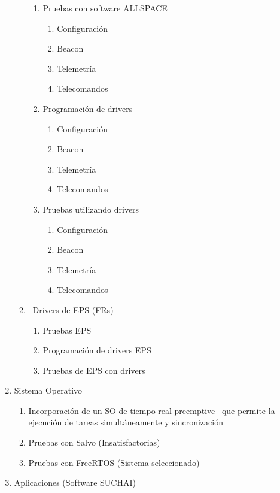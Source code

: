 \documentclass{article}
\begin{document}
\begin{enumerate}
\begin{enumerate}
\begin{enumerate}
\item Pruebas con software ALLSPACE

\begin{enumerate}
\item Configuración
\item Beacon
\item Telemetría
\item Telecomandos
\end{enumerate}
\item Programación de drivers

\begin{enumerate}
\item Configuración
\item Beacon
\item Telemetría
\item Telecomandos
\end{enumerate}
\item Pruebas utilizando drivers

\begin{enumerate}
\item Configuración
\item Beacon
\item Telemetría
\item Telecomandos
\end{enumerate}
\end{enumerate}
\item \ Drivers de EPS (FRs)

\begin{enumerate}
\item Pruebas EPS
\item Programación de drivers EPS
\item Pruebas de EPS con drivers
\end{enumerate}
\end{enumerate}
\item Sistema Operativo

\begin{enumerate}
\item Incorporación de un SO de tiempo real preemptive \ que permite la
ejecución de tareas simultáneamente y sincronización
\item Pruebas con Salvo (Insatisfactorias)
\item Pruebas con FreeRTOS (Sistema seleccionado)
\end{enumerate}
\item Aplicaciones (Software SUCHAI)


\end{enumerate}
\end{document}
